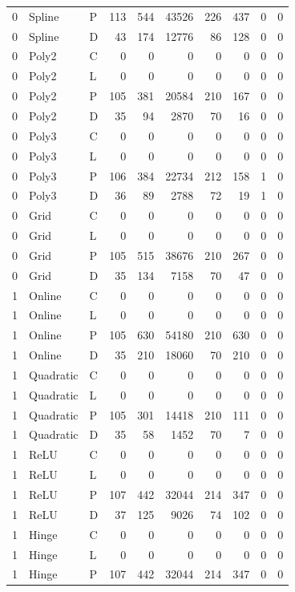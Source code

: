 \begin{longtable}{lllrrrrrrr}
0 & Spline & P & 113 & 544 & 43526 & 226 & 437 & 0 & 0 \\
0 & Spline & D & 43 & 174 & 12776 & 86 & 128 & 0 & 0 \\
0 & Poly2 & C & 0 & 0 & 0 & 0 & 0 & 0 & 0 \\
0 & Poly2 & L & 0 & 0 & 0 & 0 & 0 & 0 & 0 \\
0 & Poly2 & P & 105 & 381 & 20584 & 210 & 167 & 0 & 0 \\
0 & Poly2 & D & 35 & 94 & 2870 & 70 & 16 & 0 & 0 \\
0 & Poly3 & C & 0 & 0 & 0 & 0 & 0 & 0 & 0 \\
0 & Poly3 & L & 0 & 0 & 0 & 0 & 0 & 0 & 0 \\
0 & Poly3 & P & 106 & 384 & 22734 & 212 & 158 & 1 & 0 \\
0 & Poly3 & D & 36 & 89 & 2788 & 72 & 19 & 1 & 0 \\
0 & Grid & C & 0 & 0 & 0 & 0 & 0 & 0 & 0 \\
0 & Grid & L & 0 & 0 & 0 & 0 & 0 & 0 & 0 \\
0 & Grid & P & 105 & 515 & 38676 & 210 & 267 & 0 & 0 \\
0 & Grid & D & 35 & 134 & 7158 & 70 & 47 & 0 & 0 \\
1 & Online & C & 0 & 0 & 0 & 0 & 0 & 0 & 0 \\
1 & Online & L & 0 & 0 & 0 & 0 & 0 & 0 & 0 \\
1 & Online & P & 105 & 630 & 54180 & 210 & 630 & 0 & 0 \\
1 & Online & D & 35 & 210 & 18060 & 70 & 210 & 0 & 0 \\
1 & Quadratic & C & 0 & 0 & 0 & 0 & 0 & 0 & 0 \\
1 & Quadratic & L & 0 & 0 & 0 & 0 & 0 & 0 & 0 \\
1 & Quadratic & P & 105 & 301 & 14418 & 210 & 111 & 0 & 0 \\
1 & Quadratic & D & 35 & 58 & 1452 & 70 & 7 & 0 & 0 \\
1 & ReLU & C & 0 & 0 & 0 & 0 & 0 & 0 & 0 \\
1 & ReLU & L & 0 & 0 & 0 & 0 & 0 & 0 & 0 \\
1 & ReLU & P & 107 & 442 & 32044 & 214 & 347 & 0 & 0 \\
1 & ReLU & D & 37 & 125 & 9026 & 74 & 102 & 0 & 0 \\
1 & Hinge & C & 0 & 0 & 0 & 0 & 0 & 0 & 0 \\
1 & Hinge & L & 0 & 0 & 0 & 0 & 0 & 0 & 0 \\
1 & Hinge & P & 107 & 442 & 32044 & 214 & 347 & 0 & 0 \\

\end{longtable}
